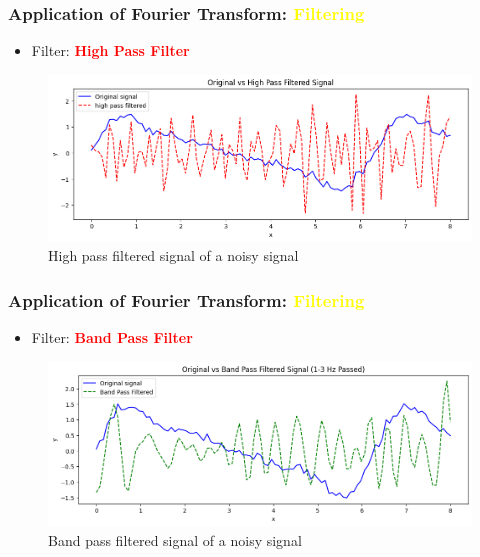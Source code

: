\documentclass[aspectratio=1610]{beamer}
\begin{document}
  \begin{frame}
    \frametitle{Application of Fourier Transform: \textcolor{yellow}{Filtering}}
    \begin{itemize} [label=$\star$, itemsep=4pt, parsep=0pt, topsep=10pt]
        \item<1-> Filter:  \textbf{\textcolor{red}{High Pass Filter}}
    \end{itemize}
    \vspace{-10pt}
    \begin{figure}
        \centering
        \includegraphics[width=0.8\linewidth,height=0.5\linewidth]{images/highPassFilter.png}
        \caption{High pass filtered signal of a noisy signal}
        \label{fig:enter-label}
    \end{figure}
  \end{frame}
  
  \begin{frame}
    \frametitle{Application of Fourier Transform: \textcolor{yellow}{Filtering}}
    \begin{itemize} [label=$\star$, itemsep=4pt, parsep=0pt, topsep=10pt]
        \item<1-> Filter:  \textbf{\textcolor{red}{Band Pass Filter}}
    \end{itemize}
    \vspace{-10pt}
    \begin{figure}
        \centering
        \includegraphics[width=0.8\linewidth,height=0.5\linewidth]{images/bandPassSignal.png}
        \caption{Band pass filtered signal of a noisy signal}
        \label{fig:enter-label}
    \end{figure}
  \end{frame}
  
\end{document}
